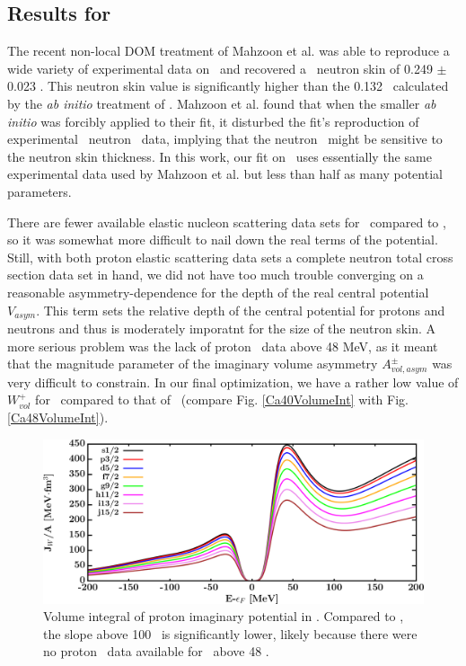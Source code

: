 \subsection{Results for \caEight}
The recent non-local DOM treatment of Mahzoon et al. \cite{Mahzoon2017} was able
to reproduce a wide variety of
experimental data on \caEight\ and recovered a \caEight\ neutron
skin of 0.249 $\pm$ 0.023 \femto\meter.
This neutron skin value is significantly higher than the 0.132 \femto\meter\ calculated by
the \textit{ab initio} treatment of \cite{Hagen2016}. Mahzoon et al. found that when the 
smaller \textit{ab initio} was forcibly applied to their fit, it disturbed the fit's
reproduction of experimental \caEight\ neutron \tot\ data, implying that the neutron \tot\ might
be sensitive to the neutron skin thickness. In this work, our fit on \caEight\ uses essentially the 
same experimental data used by Mahzoon et al. but less than half as many potential parameters.

There are fewer available elastic nucleon scattering data sets for \caEight\ compared to \caForty,
so it was somewhat more difficult to nail down the real terms of the potential. Still, with both
proton elastic scattering data sets a complete neutron total cross section data set in hand, we did
not have too much trouble converging on a reasonable asymmetry-dependence for the depth of the real
central potential $V_{asym}$. This term sets the relative depth of the central potential for protons 
and neutrons and thus is moderately imporatnt for the size of the neutron skin. A more serious
problem was the lack of proton \rxn\ data above 48 MeV, as it meant that the magnitude parameter
of the imaginary volume asymmetry $A_{vol, asym}^{\pm}$ was very difficult to constrain. In our
final optimization, we have a rather low value of $W_{vol}^{+}$ for \caEight\ compared to that of
\caForty\ (compare Fig. \ref{Ca40VolumeInt} with Fig. \ref{Ca48VolumeInt}).

\begin{figure}[tb]
    \centering
    \includegraphics[width=\textwidth]{figures/ca48_protonVolumeIntegrals.png}
    \caption[Volume integral of proton imaginary potential in \caEight]
    {
        Volume integral of proton imaginary potential in \caEight.
        Compared to \caForty, the slope
        above 100 \mega\electronvolt\ is significantly lower, likely
        because there were no proton \rxn\ data
        available for \caEight\ above 48 \mega\electronvolt.
    }
    \label{ca48ProtonVolumeIntegral}
\end{figure}

